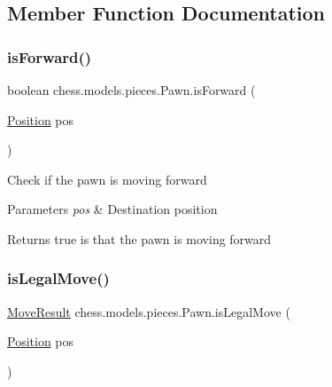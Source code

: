 \subsection{Member Function Documentation}
\mbox{\label{classchess_1_1models_1_1pieces_1_1_pawn_a80055e2b99a160f4de32644423460a6f}} 
\subsubsection{\texorpdfstring{is\+Forward()}{isForward()}}
{\footnotesize\ttfamily boolean chess.\+models.\+pieces.\+Pawn.\+is\+Forward (\begin{DoxyParamCaption}\item[{\mbox{\hyperlink{classchess_1_1models_1_1_position}{Position}}}]{pos }\end{DoxyParamCaption})}

Check if the pawn is moving forward


\begin{DoxyParams}{Parameters}
{\em pos} & Destination position \\
\hline
\end{DoxyParams}
\begin{DoxyReturn}{Returns}
true is that the pawn is moving forward 
\end{DoxyReturn}
\mbox{\label{classchess_1_1models_1_1pieces_1_1_pawn_ae293ed0d437de535ad14a543a1077871}} 
\subsubsection{\texorpdfstring{is\+Legal\+Move()}{isLegalMove()}}
{\footnotesize\ttfamily \mbox{\hyperlink{enumchess_1_1models_1_1enums_1_1_move_result}{Move\+Result}} chess.\+models.\+pieces.\+Pawn.\+is\+Legal\+Move (\begin{DoxyParamCaption}\item[{\mbox{\hyperlink{classchess_1_1models_1_1_position}{Position}}}]{pos }\end{DoxyParamCaption})}

